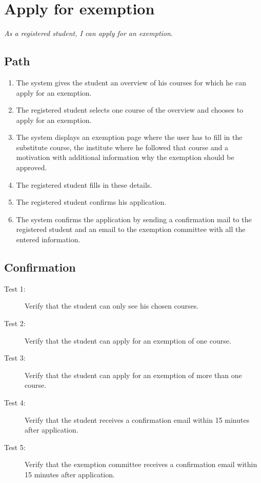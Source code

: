 \section{Apply for exemption}

\par \emph{As a registered student, I can apply for an exemption.}

\subsection{Path}

\begin{enumerate}
  \item The system gives the student an overview of his courses for which he 
  can apply for an exemption.
  \item The registered student selects one course of the overview and chooses to
  apply for an exemption.
  \item The system displays an exemption page where the user has to fill in the
  substitute course, the institute where he followed that course and a
  motivation with additional information why the exemption should be approved.
  \item The registered student fills in these details.
  \item The registered student confirms his application.
  \item The system confirms the application by sending a confirmation mail to the
  registered student and an email to the exemption committee with all the entered 
  information.
\end{enumerate}

\subsection{Confirmation}

\begin{description}
\item[Test 1:] Verify that the student can only see his chosen courses.
\item[Test 2:] Verify that the student can apply for an exemption of one course.
\item[Test 3:] Verify that the student can apply for an exemption of more than
one course.
\item[Test 4:] Verify that the student receives a confirmation email within 15
minutes after application.
\item[Test 5:] Verify that the exemption committee receives a confirmation email
within 15 minutes after application.
\end{description}



